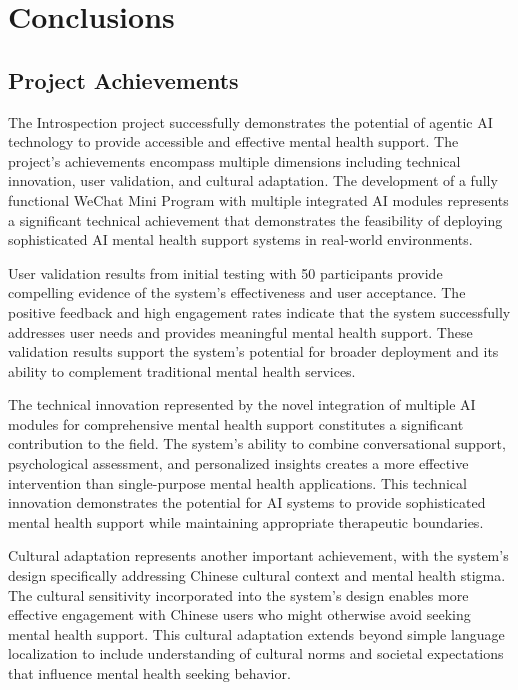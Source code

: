 \section{Conclusions}
\label{sec:conclusions}

\subsection{Project Achievements}

The Introspection project successfully demonstrates the potential of agentic AI technology to provide accessible and effective mental health support. The project's achievements encompass multiple dimensions including technical innovation, user validation, and cultural adaptation. The development of a fully functional WeChat Mini Program with multiple integrated AI modules represents a significant technical achievement that demonstrates the feasibility of deploying sophisticated AI mental health support systems in real-world environments.

User validation results from initial testing with 50 participants provide compelling evidence of the system's effectiveness and user acceptance. The positive feedback and high engagement rates indicate that the system successfully addresses user needs and provides meaningful mental health support. These validation results support the system's potential for broader deployment and its ability to complement traditional mental health services.

The technical innovation represented by the novel integration of multiple AI modules for comprehensive mental health support constitutes a significant contribution to the field. The system's ability to combine conversational support, psychological assessment, and personalized insights creates a more effective intervention than single-purpose mental health applications. This technical innovation demonstrates the potential for AI systems to provide sophisticated mental health support while maintaining appropriate therapeutic boundaries.

Cultural adaptation represents another important achievement, with the system's design specifically addressing Chinese cultural context and mental health stigma. The cultural sensitivity incorporated into the system's design enables more effective engagement with Chinese users who might otherwise avoid seeking mental health support. This cultural adaptation extends beyond simple language localization to include understanding of cultural norms and societal expectations that influence mental health seeking behavior.

